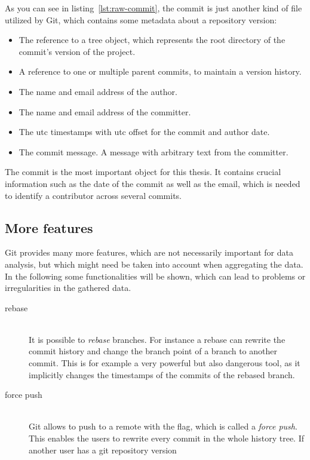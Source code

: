 As you can see in listing~\ref{lst:raw-commit}, the commit is just another kind of file utilized by Git, which contains some metadata about a repository version:

\begin{itemize}
    \item The reference to a tree object, which represents the root directory of the commit's version of the project.
    \item A reference to one or multiple parent commits, to maintain a version history.
    \item The name and email address of the author.
    \item The name and email address of the committer.
    \item The \ac{utc} timestamps with \ac{utc} offset for the commit and author date.
    \item The commit message. A message with arbitrary text from the committer.
\end{itemize}

The commit is the most important object for this thesis.
It contains crucial information such as the date of the commit as well as the email, which is needed to identify a contributor across several commits.


\subsection{More features}\label{more-git-features}

Git provides many more features, which are not necessarily important for data analysis, but which might need be taken into account when aggregating the data.
In the following some functionalities will be shown, which can lead to problems or irregularities in the gathered data.

\begin{description}
    \item[rebase] \hfill \\
        It is possible to \emph{rebase} branches. For instance a rebase can rewrite the commit history and change the branch point of a branch to another commit.
        This is for example a very powerful but also dangerous tool, as it implicitly changes the timestamps of the commits of the rebased branch.

    \item[force push] \hfill \\
        Git allows to push to a remote with the  flag, which is called a \emph{force push}.
        This enables the users to rewrite every commit in the whole history tree. If another user has a git repository version
\end{description}

